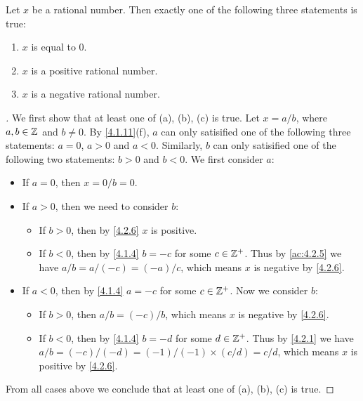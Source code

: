 \begin{lem}\label{4.2.7}
  Let \(x\) be a rational number.
  Then exactly one of the following three statements is true:
  \begin{enumerate}
    \item \(x\) is equal to \(0\).
    \item \(x\) is a positive rational number.
    \item \(x\) is a negative rational number.
  \end{enumerate}
\end{lem}

\begin{proof}[]
  We first show that at least one of (a), (b), (c) is true.
  Let \(x = a / b\), where \(a, b \in \mathbb{Z}\) and \(b \neq 0\).
  By \cref{4.1.11}(f), \(a\) can only satisified one of the following three statements:
  \(a = 0\), \(a > 0\) and \(a < 0\).
  Similarly, \(b\) can only satisified one of the following two statements:
  \(b > 0\) and \(b < 0\).
  We first consider \(a\):
  \begin{itemize}
    \item If \(a = 0\), then \(x = 0 / b = 0\).
    \item If \(a > 0\), then we need to consider \(b\):
          \begin{itemize}
            \item If \(b > 0\), then by \cref{4.2.6} \(x\) is positive.
            \item If \(b < 0\), then by \cref{4.1.4} \(b = -c\) for some \(c \in \mathbb{Z}^+\).
                  Thus by \cref{ac:4.2.5} we have \(a / b = a / (-c) = (-a) / c\), which means \(x\) is negative by \cref{4.2.6}.
          \end{itemize}
    \item If \(a < 0\), then by \cref{4.1.4} \(a = -c\) for some \(c \in \mathbb{Z}^+\).
          Now we consider \(b\):
          \begin{itemize}
            \item If \(b > 0\), then \(a / b = (-c) / b\), which means \(x\) is negative by \cref{4.2.6}.
            \item If \(b < 0\), then by \cref{4.1.4} \(b = -d\) for some \(d \in \mathbb{Z}^+\).
                  Thus by \cref{4.2.1} we have \(a / b = (-c) / (-d) = (-1) / (-1) \times (c / d) = c / d\), which means \(x\) is positive by \cref{4.2.6}.
          \end{itemize}
  \end{itemize}
  From all cases above we conclude that at least one of (a), (b), (c) is true.


\end{proof}
